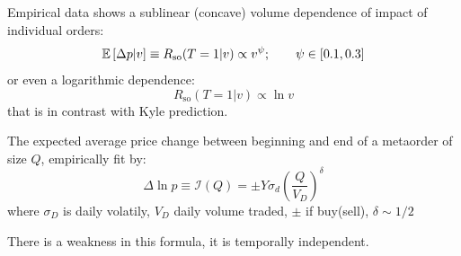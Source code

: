 \newpage
Empirical data shows a sublinear (concave) volume dependence of impact of individual orders:
\[
\mathbb{E}\left[\Delta p|v\right] \equiv R_{\text{so}}(T =1 |v) \propto v^{\psi}; \qquad \psi \in[0.1,0.3]
\]
or even a logarithmic dependence:
\[
R_{\text{so}}(T = 1|v)\propto \ln v
\]
that is in contrast with Kyle prediction.
\begin{mydefinition}
	The expected average price change between beginning and end of a metaorder of size $Q$, empirically fit by:
	\begin{equation}
		\Delta \ln p \equiv \mathcal{I}(Q) = \pm Y \sigma_d \left(\frac{Q}{V_D}\right)^\delta
	\end{equation}
where $\sigma_D$ is daily volatily, $V_D$ daily volume traded, $\pm$ if buy(sell), $\delta \sim 1/2$ 
\end{mydefinition}
There is a weakness in this formula, it is temporally independent.
